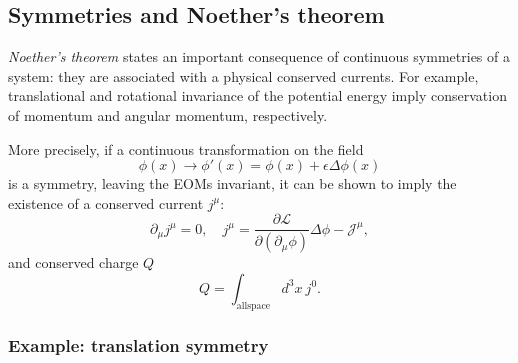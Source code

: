 \subsection{Symmetries and Noether's theorem}
\label{sec:01_qft_classical_symmetries}

\textit{Noether's theorem} states an important consequence of continuous symmetries of a system: they are associated with a physical conserved currents.
For example, translational and rotational invariance of the potential energy imply conservation of momentum and angular momentum, respectively.

More precisely, if a continuous transformation on the field
\begin{equation}
	\label{eq:01_qft_symmetries_transformation}
	\phi(x) \rightarrow \phi'(x) = \phi(x) + \epsilon\Delta\phi(x)
\end{equation}
is a symmetry, leaving the EOMs invariant,
it can be shown to imply the existence of a conserved current $j^\mu$:
\begin{equation}
	\label{eq:01_qft_symmetries_current}
	\partial_\mu j^\mu = 0, \quad j^\mu = \frac{\partial\mathcal L}{\partial(\partial_\mu\phi)}\Delta\phi - \mathcal J^\mu,
\end{equation}
and conserved charge $Q$
\begin{equation}
	\label{eq:01_qft_symmetries_charge}
	Q = \int_{\mathrm{all space}} d^3x\ j^0.
\end{equation}


\subsubsection{Example: translation symmetry}

